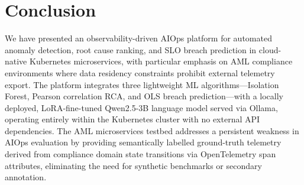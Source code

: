 \documentclass[a4paper]{lipics-v2021}
\newcommand{\mypara}[1]{{\vspace{0.1mm}\noindent\textbf{#1}}}
\begin{document}



\section{Conclusion}
\label{sec:conclusion}

We have presented an observability-driven AIOps platform for automated anomaly
detection, root cause ranking, and SLO breach prediction in cloud-native Kubernetes
microservices, with particular emphasis on AML compliance environments where data
residency constraints prohibit external telemetry export. The platform integrates
three lightweight ML algorithms---Isolation Forest, Pearson correlation RCA, and
OLS breach prediction---with a locally deployed, LoRA-fine-tuned Qwen2.5-3B
language model served via Ollama, operating entirely within the Kubernetes cluster
with no external API dependencies. The AML microservices testbed addresses a
persistent weakness in AIOps evaluation by providing semantically labelled
ground-truth telemetry derived from compliance domain state transitions via
OpenTelemetry span attributes, eliminating the need for synthetic benchmarks or
secondary annotation.
\end{document}
